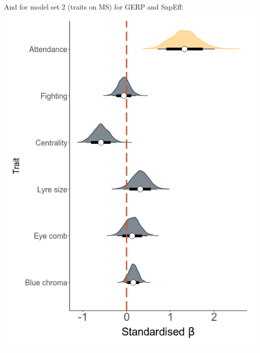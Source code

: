 \documentclass[
  letterpaper,
  DIV=11,
  numbers=noendperiod]{scrreprt}
\begin{document}
And for model set 2 (traits on MS) for GERP and SnpEff:
\includegraphics{qmd/../plots/main/fig_3_right_traits_ams.png}
\end{document}
